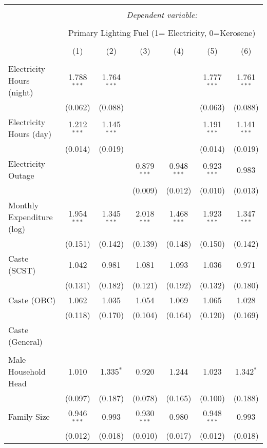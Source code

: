 
\begin{tabular}{@{\extracolsep{5pt}}lcccccc} 
\\[-1.8ex]\hline 
\hline \\[-1.8ex] 
 & \multicolumn{6}{c}{\textit{Dependent variable:}} \\ 
\cline{2-7} 
\\[-1.8ex] & \multicolumn{6}{c}{Primary Lighting Fuel (1= Electricity, 0=Kerosene)} \\ 
\\[-1.8ex] & (1) & (2) & (3) & (4) & (5) & (6)\\ 
\hline \\[-1.8ex] 
 Electricity Hours (night) & 1.788$^{***}$ & 1.764$^{***}$ &  &  & 1.777$^{***}$ & 1.761$^{***}$ \\ 
  & (0.062) & (0.088) &  &  & (0.063) & (0.088) \\ 
  Electricity Hours (day) & 1.212$^{***}$ & 1.145$^{***}$ &  &  & 1.191$^{***}$ & 1.141$^{***}$ \\ 
  & (0.014) & (0.019) &  &  & (0.014) & (0.019) \\ 
  Electricity Outage &  &  & 0.879$^{***}$ & 0.948$^{***}$ & 0.923$^{***}$ & 0.983 \\ 
  &  &  & (0.009) & (0.012) & (0.010) & (0.013) \\ 
  Monthly Expenditure (log) & 1.954$^{***}$ & 1.345$^{***}$ & 2.018$^{***}$ & 1.468$^{***}$ & 1.923$^{***}$ & 1.347$^{***}$ \\ 
  & (0.151) & (0.142) & (0.139) & (0.148) & (0.150) & (0.142) \\ 
  Caste (SCST) & 1.042 & 0.981 & 1.081 & 1.093 & 1.036 & 0.971 \\ 
  & (0.131) & (0.182) & (0.121) & (0.192) & (0.132) & (0.180) \\ 
  Caste (OBC) & 1.062 & 1.035 & 1.054 & 1.069 & 1.065 & 1.028 \\ 
  & (0.118) & (0.170) & (0.104) & (0.164) & (0.120) & (0.169) \\ 
  Caste (General) &  &  &  &  &  &  \\ 
  &  &  &  &  &  &  \\ 
  Male Household Head & 1.010 & 1.335$^{*}$ & 0.920 & 1.244 & 1.023 & 1.342$^{*}$ \\ 
  & (0.097) & (0.187) & (0.078) & (0.165) & (0.100) & (0.188) \\ 
  Family Size & 0.946$^{***}$ & 0.993 & 0.930$^{***}$ & 0.980 & 0.948$^{***}$ & 0.993 \\ 
  & (0.012) & (0.018) & (0.010) & (0.017) & (0.012) & (0.018) \\ 

\end{tabular}
